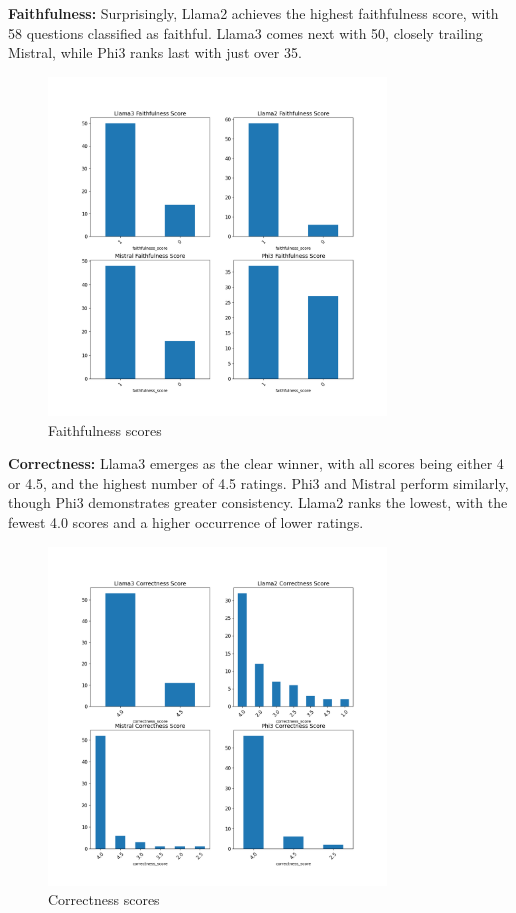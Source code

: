 \documentclass[]{article}
\begin{document}
\textbf{Faithfulness:}
Surprisingly, Llama2 achieves the highest faithfulness score, with 58 questions classified as faithful. 
Llama3 comes next with 50, closely trailing Mistral, while Phi3 ranks last with just over 35.
\begin{figure}[H]
    \centering
    \includegraphics[width=0.8\textwidth]{./images/faith_zara.png}
    \caption{Faithfulness scores}
    \label{fig:image_label}
\end{figure}


\textbf{Correctness:}
Llama3 emerges as the clear winner, with all scores being either 4 or 4.5, and the highest number of 4.5 ratings. Phi3 and Mistral perform similarly, though Phi3 demonstrates greater consistency. 
Llama2 ranks the lowest, with the fewest 4.0 scores and a higher occurrence of lower ratings.
\begin{figure}[H]
    \centering
    \includegraphics[width=0.8\textwidth]{./images/correct_zara.png}
    \caption{Correctness scores}
    \label{fig:image_label}
\end{figure}
\end{document}

